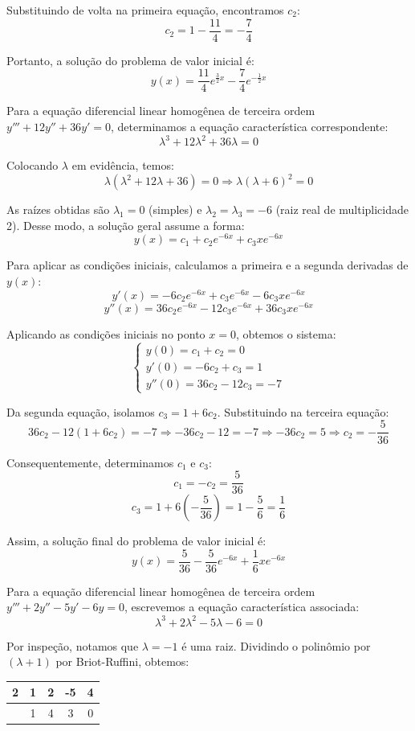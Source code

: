 \documentclass[oneside,12pt,a4paper]{report}
\begin{document}
\begin{resolucao}
    Substituindo de volta na primeira equação, encontramos $c_2$:
    \[c_2 = 1 - \frac{11}{4} = -\frac{7}{4}\]

    Portanto, a solução do problema de valor inicial é:
    \[\boxed{y(x) = \frac{11}{4}e^{\frac{3}{2}x} - \frac{7}{4}e^{-\frac{1}{2}x}}\]

    \itemresolucao Para a equação diferencial linear homogênea de terceira ordem $y''' + 12y'' + 36y' = 0$, determinamos a equação característica correspondente:
    \[\lambda^3 + 12\lambda^2 + 36\lambda = 0\]

    Colocando $\lambda$ em evidência, temos:
    \[\lambda(\lambda^2 + 12\lambda + 36) = 0 \Rightarrow \lambda(\lambda + 6)^2 = 0\]

    As raízes obtidas são $\lambda_1 = 0$ (simples) e $\lambda_2 = \lambda_3 = -6$ (raiz real de multiplicidade 2). Desse modo, a solução geral assume a forma:
    \[y(x) = c_1 + c_2 e^{-6x} + c_3 x e^{-6x}\]

    Para aplicar as condições iniciais, calculamos a primeira e a segunda derivadas de $y(x)$:
    \[y'(x) = -6c_2 e^{-6x} + c_3 e^{-6x} - 6c_3 x e^{-6x}\]
    \[y''(x) = 36c_2 e^{-6x} - 12c_3 e^{-6x} + 36c_3 x e^{-6x}\]

    Aplicando as condições iniciais no ponto $x = 0$, obtemos o sistema:
    \[\begin{cases}
        y(0) = c_1 + c_2 = 0 \\
        y'(0) = -6c_2 + c_3 = 1 \\
        y''(0) = 36c_2 - 12c_3 = -7
    \end{cases}\]

    Da segunda equação, isolamos $c_3 = 1 + 6c_2$. Substituindo na terceira equação:
    \[36c_2 - 12(1 + 6c_2) = -7 \Rightarrow -36c_2 - 12 = -7 \Rightarrow -36c_2 = 5 \Rightarrow c_2 = -\frac{5}{36}\]

    Consequentemente, determinamos $c_1$ e $c_3$:
    \[c_1 = -c_2 = \frac{5}{36}\]
    \[c_3 = 1 + 6\left(-\frac{5}{36}\right) = 1 - \frac{5}{6} = \frac{1}{6}\]

    Assim, a solução final do problema de valor inicial é:
    \[\boxed{y(x) = \frac{5}{36} - \frac{5}{36}e^{-6x} + \frac{1}{6}xe^{-6x}}\]

    \itemresolucao Para a equação diferencial linear homogênea de terceira ordem $y''' + 2y'' - 5y' - 6y = 0$, escrevemos a equação característica associada:
    \[\lambda^3 + 2\lambda^2 - 5\lambda - 6 = 0\]

    Por inspeção, notamos que $\lambda = -1$ é uma raiz. Dividindo o polinômio por $(\lambda + 1)$ por Briot-Ruffini, obtemos:
    \begin{table}[H]
        \centering
        \begin{tabular}{c|cccc}
            2 & 1 & 2 & -5 & 4\\
            \hline
              & 1 & 4 & 3 & 0
        \end{tabular}
    \end{table}


\end{resolucao}
\end{document}
